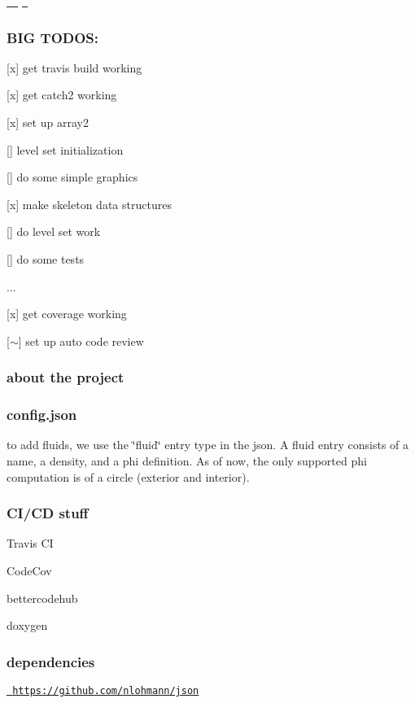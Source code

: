 \href{https://travis-ci.com/bpatmiller/gfm2d}{\texttt{ }} \href{https://codecov.io/gh/bpatmiller/gfm2d}{\texttt{ }} \href{https://bettercodehub.com/}{\texttt{ }}

\subsubsection*{B\+IG T\+O\+D\+OS\+:}


\begin{DoxyItemize}
\item \mbox{[}x\mbox{]} get travis build working
\item \mbox{[}x\mbox{]} get catch2 working
\item \mbox{[}x\mbox{]} set up array2
\item \mbox{[}\mbox{]} level set initialization
\item \mbox{[}\mbox{]} do some simple graphics
\item \mbox{[}x\mbox{]} make skeleton data structures
\item \mbox{[}\mbox{]} do level set work
\item \mbox{[}\mbox{]} do some tests
\end{DoxyItemize}

...


\begin{DoxyItemize}
\item \mbox{[}x\mbox{]} get coverage working
\item \mbox{[}$\sim$\mbox{]} set up auto code review
\end{DoxyItemize}

\subsubsection*{about the project}

\subsubsection*{config.\+json}

to add fluids, we use the \char`\"{}fluid\char`\"{} entry type in the json. A fluid entry consists of a name, a density, and a phi definition. As of now, the only supported phi computation is of a circle (exterior and interior).

\subsubsection*{C\+I/\+CD stuff}


\begin{DoxyItemize}
\item Travis CI
\item Code\+Cov
\item bettercodehub
\item doxygen
\end{DoxyItemize}

\subsubsection*{dependencies}

\href{https://github.com/nlohmann/json}{\texttt{ https\+://github.\+com/nlohmann/json}} 